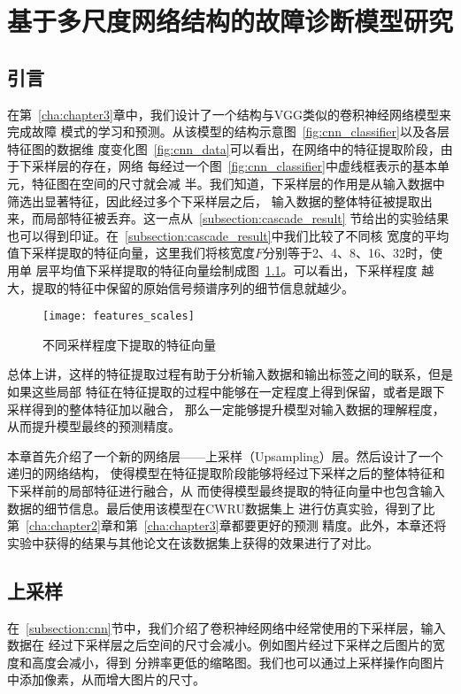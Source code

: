 \chapter{基于多尺度网络结构的故障诊断模型研究}
\label{cha:chapter4}

\section{引言}

在第~\ref{cha:chapter3}章中，我们设计了一个结构与VGG类似的卷积神经网络模型来完成故障
模式的学习和预测。从该模型的结构示意图~\ref{fig:cnn_classifier}以及各层特征图的数据维
度变化图~\ref{fig:cnn_data}可以看出，在网络中的特征提取阶段，由于下采样层的存在，网络
每经过一个图~\ref{fig:cnn_classifier}中虚线框表示的基本单元，特征图在空间的尺寸就会减
半。我们知道，下采样层的作用是从输入数据中筛选出显著特征，因此经过多个下采样层之后，
输入数据的整体特征被提取出来，而局部特征被丢弃。这一点从~\ref{subsection:cascade_result}
节给出的实验结果也可以得到印证。在~\ref{subsection:cascade_result}中我们比较了不同核
宽度的平均值下采样提取的特征向量，这里我们将核宽度$F$分别等于2、4、8、16、32时，使用单
层平均值下采样提取的特征向量绘制成图~\ref{fig:features_scales}。可以看出，下采样程度
越大，提取的特征中保留的原始信号频谱序列的细节信息就越少。
\begin{figure}[ht]
  \centering
  \texttt{[image: features\_scales]}
  \caption{不同采样程度下提取的特征向量}
  \label{fig:features_scales}
\end{figure}

总体上讲，这样的特征提取过程有助于分析输入数据和输出标签之间的联系，但是如果这些局部
特征在特征提取的过程中能够在一定程度上得到保留，或者是跟下采样得到的整体特征加以融合，
那么一定能够提升模型对输入数据的理解程度，从而提升模型最终的预测精度。

本章首先介绍了一个新的网络层——上采样（Upsampling）层。然后设计了一个递归的网络结构，
使得模型在特征提取阶段能够将经过下采样之后的整体特征和下采样前的局部特征进行融合，从
而使得模型最终提取的特征向量中也包含输入数据的细节信息。最后使用该模型在CWRU数据集上
进行仿真实验，得到了比第~\ref{cha:chapter2}章和第~\ref{cha:chapter3}章都要更好的预测
精度。此外，本章还将实验中获得的结果与其他论文在该数据集上获得的效果进行了对比。

\section{上采样}

在~\ref{subsection:cnn}节中，我们介绍了卷积神经网络中经常使用的下采样层，输入数据在
经过下采样层之后空间的尺寸会减小。例如图片经过下采样之后图片的宽度和高度会减小，得到
分辨率更低的缩略图。我们也可以通过上采样操作向图片中添加像素，从而增大图片的尺寸。

